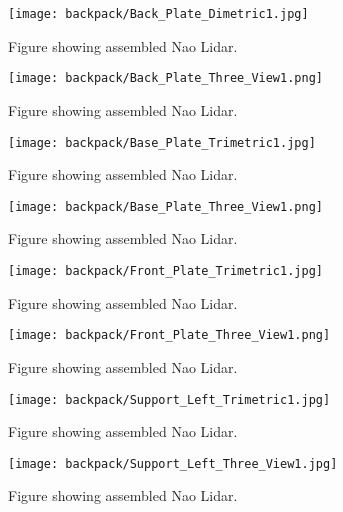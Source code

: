 \begin{figure}
\centering
\texttt{[image: backpack/Back\_Plate\_Dimetric1.jpg]}
\caption{Figure showing assembled Nao Lidar.}
\label{fig:nao_lidar_mount_backplate_dimetric1}
\end{figure}

\begin{figure}
\centering
\texttt{[image: backpack/Back\_Plate\_Three\_View1.png]}
\caption{Figure showing assembled Nao Lidar.}
\label{fig:nao_lidar_mount_backplate_three_view1}
\end{figure}

\begin{figure}
\centering
\texttt{[image: backpack/Base\_Plate\_Trimetric1.jpg]}
\caption{Figure showing assembled Nao Lidar.}
\label{fig:nao_lidar_mount_baseplate_trimetric1}
\end{figure}

\begin{figure}
\centering
\texttt{[image: backpack/Base\_Plate\_Three\_View1.png]}
\caption{Figure showing assembled Nao Lidar.}
\label{fig:nao_lidar_mount_baseplate_three_view1}
\end{figure}

\begin{figure}
\centering
\texttt{[image: backpack/Front\_Plate\_Trimetric1.jpg]}
\caption{Figure showing assembled Nao Lidar.}
\label{fig:nao_lidar_mount_frontplate_trimetric1}
\end{figure}

\begin{figure}
\centering
\texttt{[image: backpack/Front\_Plate\_Three\_View1.png]}
\caption{Figure showing assembled Nao Lidar.}
\label{fig:nao_lidar_mount_frontplate_three_view1}
\end{figure}

\begin{figure}
\centering
\texttt{[image: backpack/Support\_Left\_Trimetric1.jpg]}
\caption{Figure showing assembled Nao Lidar.}
\label{fig:nao_lidar_mount_supportleft_trimetric1}
\end{figure}

\begin{figure}
\centering
\texttt{[image: backpack/Support\_Left\_Three\_View1.jpg]}
\caption{Figure showing assembled Nao Lidar.}
\label{fig:nao_lidar_mount_supportleft_three_view1}
\end{figure}

